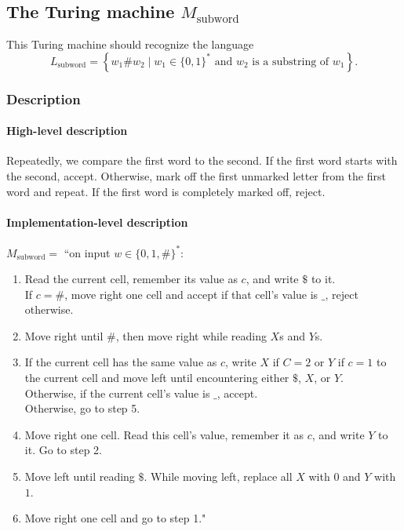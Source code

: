 \subsection{The Turing machine $M_\text{subword}$}

This Turing machine should recognize the language
$$
    L_\text{subword} = \left\{ w_1 \# w_2 \mid \text{$w_1 \in \{0,1\}^*$ and $w_2$ is a substring of $w_1$} \right\}.
$$


\subsubsection{Description}

\paragraph{High-level description}

Repeatedly, we compare the first word to the second. If the first word starts with the second, accept. Otherwise, mark off the first unmarked letter from the first word and repeat. If the first word is completely marked off, reject. 


\paragraph{Implementation-level description}
$M_{\text{subword}}=$
``on input $w \in \{0,1,\#\}^*$:
\begin{enumerate}
    \item Read the current cell, remember its value as $c$, and write $\$$ to it. \\
        If $c=\#$, move right one cell and accept if that cell's value is $\_$, reject otherwise.
    \item Move right until $\#$, then move right while reading $X$s and $Y$s.
    \item If the current cell has the same value as $c$, write $X$ if $C=2$ or $Y$ if $c=1$ to the current cell and move left until encountering either $\$$, $X$, or $Y$. \\
        Otherwise, if the current cell's value is $\_$, accept. \\
        Otherwise, go to step 5.
    \item Move right one cell. Read this cell's value, remember it as $c$, and write $Y$ to it. Go to step 2.
    \item Move left until reading $\$$. While moving left, replace all $X$ with $0$ and $Y$ with $1$.
    \item Move right one cell and go to step 1."
\end{enumerate}

